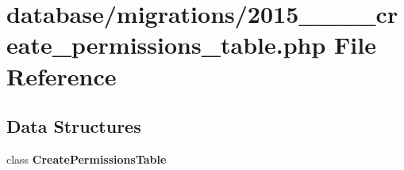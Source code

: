 \section{database/migrations/2015\+\_\+\_\+\_\+\_\+create\+\_\+permissions\+\_\+table.php File Reference}
\label{2015__03__10__193732__create__permissions__table_8php}
\subsection*{Data Structures}
\begin{DoxyCompactItemize}
\item 
class {\bf Create\+Permissions\+Table}
\end{DoxyCompactItemize}
